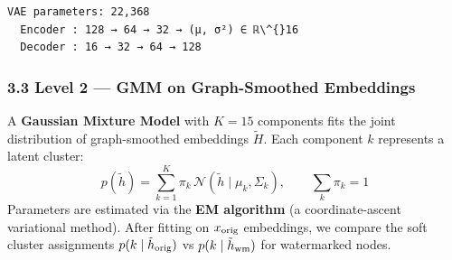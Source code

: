 \documentclass[11pt]{article}
\begin{document}
    \begin{Verbatim}[commandchars=\\\{\}]
VAE parameters: 22,368
  Encoder : 128 → 64 → 32 → (μ, σ²) ∈ ℝ\^{}16
  Decoder : 16 → 32 → 64 → 128
    \end{Verbatim}

    \subsubsection{3.3 Level 2 --- GMM on Graph-Smoothed
Embeddings}\label{level-2-gmm-on-graph-smoothed-embeddings}

A \textbf{Gaussian Mixture Model} with \(K=15\) components fits the
joint distribution of graph-smoothed embeddings \(\tilde{H}\). Each
component \(k\) represents a latent cluster: \[
p(\tilde{h}) = \sum_{k=1}^{K} \pi_k \, \mathcal{N}(\tilde{h} \mid \mu_k, \Sigma_k),
\qquad \sum_k \pi_k = 1
\] Parameters are estimated via the \textbf{EM algorithm} (a
coordinate-ascent variational method). After fitting on \(x_{\rm orig}\)
embeddings, we compare the soft cluster assignments
\(p(k \mid \tilde{h}_{\rm orig})\) vs \(p(k \mid \tilde{h}_{\rm wm})\)
for watermarked nodes.
\end{document}
